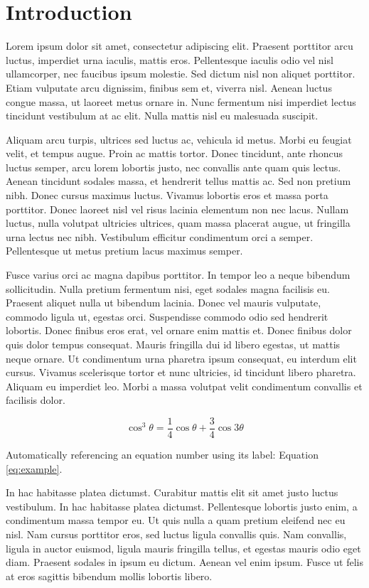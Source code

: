\section{Introduction}

Lorem ipsum dolor sit amet, consectetur adipiscing elit. Praesent porttitor arcu luctus,
imperdiet urna iaculis, mattis eros. Pellentesque iaculis odio vel nisl ullamcorper, nec
faucibus ipsum molestie. Sed dictum nisl non aliquet porttitor. Etiam vulputate arcu
dignissim, finibus sem et, viverra nisl. Aenean luctus congue massa, ut laoreet metus
ornare in. Nunc fermentum nisi imperdiet lectus tincidunt vestibulum at ac elit. Nulla
mattis nisl eu malesuada suscipit.

Aliquam arcu turpis, ultrices sed luctus ac, vehicula id metus. Morbi eu feugiat velit,
et tempus augue. Proin ac mattis tortor. Donec tincidunt, ante rhoncus luctus semper,
arcu lorem lobortis justo, nec convallis ante quam quis lectus. Aenean tincidunt sodales
massa, et hendrerit tellus mattis ac. Sed non pretium nibh. Donec cursus maximus luctus.
Vivamus lobortis eros et massa porta porttitor. Donec laoreet nisl vel risus lacinia
elementum non nec lacus. Nullam luctus, nulla volutpat ultricies ultrices, quam massa
placerat augue, ut fringilla urna lectus nec nibh. Vestibulum efficitur condimentum orci
a semper. Pellentesque ut metus pretium lacus maximus semper.

Fusce varius orci ac magna dapibus porttitor. In tempor leo a neque bibendum
sollicitudin. Nulla pretium fermentum nisi, eget sodales magna facilisis eu. Praesent
aliquet nulla ut bibendum lacinia. Donec vel mauris vulputate, commodo ligula ut, egestas
orci. Suspendisse commodo odio sed hendrerit lobortis. Donec finibus eros erat, vel
ornare enim mattis et. Donec finibus dolor quis dolor tempus consequat. Mauris fringilla
dui id libero egestas, ut mattis neque ornare. Ut condimentum urna pharetra ipsum
consequat, eu interdum elit cursus. Vivamus scelerisque tortor et nunc ultricies, id
tincidunt libero pharetra. Aliquam eu imperdiet leo. Morbi a massa volutpat velit
condimentum convallis et facilisis dolor.

\begin{equation}
  \cos^3 \theta =\frac{1}{4}\cos\theta+\frac{3}{4}\cos 3\theta
  \label{eq:example}
\end{equation}

Automatically referencing an equation number using its label: Equation \ref{eq:example}.

In hac habitasse platea dictumst. Curabitur mattis elit sit amet justo luctus vestibulum.
In hac habitasse platea dictumst. Pellentesque lobortis justo enim, a condimentum massa
tempor eu. Ut quis nulla a quam pretium eleifend nec eu nisl. Nam cursus porttitor eros,
sed luctus ligula convallis quis. Nam convallis, ligula in auctor euismod, ligula mauris
fringilla tellus, et egestas mauris odio eget diam. Praesent sodales in ipsum eu dictum.
Aenean vel enim ipsum. Fusce ut felis at eros sagittis bibendum mollis lobortis libero.

